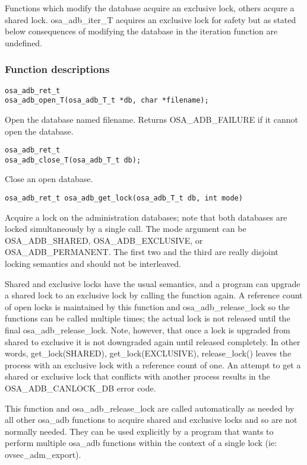 Functions which modify the database acquire an exclusive lock, others
acqure a shared lock.  osa_adb_iter_T acquires an exclusive lock for
safety but as stated below consequences of modifying the database in
the iteration function are undefined.

\subsubsection{Function descriptions}

\begin{verbatim}
osa_adb_ret_t
osa_adb_open_T(osa_adb_T_t *db, char *filename);
\end{verbatim}
%
Open the database named filename.  Returns OSA_ADB_FAILURE if it
cannot open the database.

\begin{verbatim}
osa_adb_ret_t
osa_adb_close_T(osa_adb_T_t db);
\end{verbatim}
%
Close an open database.

\begin{verbatim}
osa_adb_ret_t osa_adb_get_lock(osa_adb_T_t db, int mode)
\end{verbatim}

Acquire a lock on the administration databases; note that both
databases are locked simultaneously by a single call.  The mode
argument can be OSA_ADB_SHARED, OSA_ADB_EXCLUSIVE, or
OSA_ADB_PERMANENT.  The first two and the third are really disjoint
locking semantics and should not be interleaved.

Shared and exclusive locks have the usual semantics, and a program can
upgrade a shared lock to an exclusive lock by calling the function
again.  A reference count of open locks is maintained by this function
and osa_adb_release_lock so the functions can be called multiple
times; the actual lock is not released until the final
osa_adb_release_lock.  Note, however, that once a lock is upgraded
from shared to exclusive it is not downgraded again until released
completely.  In other words, get_lock(SHARED), get_lock(EXCLUSIVE),
release_lock() leaves the process with an exclusive lock with a
reference count of one.  An attempt to get a shared or exclusive lock
that conflicts with another process results in the OSA_ADB_CANLOCK_DB
error code.

This function and osa_adb_release_lock are called automatically as
needed by all other osa_adb functions to acquire shared and exclusive
locks and so are not normally needed.  They can be used explicitly by
a program that wants to perform multiple osa_adb functions within the
context of a single lock (ie: ovsec_adm_export).

